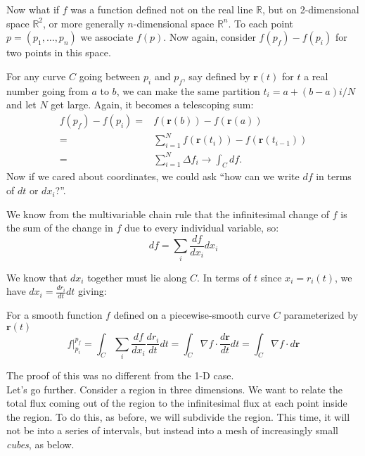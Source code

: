 \documentclass[../master.tex]{subfiles}
\begin{document}
	
	Now what if $f$ was a function defined not on the real line $\mathbb{R}$, but on 2-dimensional space $\mathbb{R}^2$, or more generally $n$-dimensional space $\mathbb{R}^n$. To each point $p = (p_1, \dots, p_n)$ we associate $f(p)$. Now again, consider $f(p_f)-f(p_i)$ for two points in this space.
	
	For any curve $C$ going between $p_i$ and $p_f$, say defined by $\mathbf r(t)$ for $t$ a real number going from $a$ to $b$, we can make the same partition $t_i = a + (b-a)i/N$ and let $N$ get large. Again, it becomes a telescoping sum:
	\begin{align*}
		f(p_f) - f(p_i) = &f(\mathbf r(b)) - f(\mathbf r(a)) \\= & \sum_{i=1}^N f(\mathbf r(t_{i}))-f(\mathbf r(t_{i-1})) \\ = & \sum_{i=1}^N \Delta f_i  \rightarrow \int_C df.
	\end{align*}
	Now if we cared about coordinates, we could ask ``how can we write $df$ in terms of $dt$ or $dx_i$?''. 
	
	We know from the multivariable chain rule that the infinitesimal change of $f$ is the sum of the change in $f$ due to every individual variable, so: 
	\begin{equation}
		df = \sum_i \frac{df}{dx_i} dx_i
	\end{equation}

	We know that $dx_i$ together must lie along $C$. In terms of $t$ since $x_i = r_i (t)$, we have $dx_i = \frac{dr_i}{dt} dt$ giving:
	\begin{theorem}
	For a smooth function $f$ defined on a piecewise-smooth curve $C$ parameterized by $\mathbf r(t)$
		\begin{equation}
			f\rvert^{p_f}_{p_i} = \int_C \sum_i \frac{df}{dx_i} \frac{dr_i}{dt} dt = \int_C \nabla f \cdot \frac{d \mathbf r}{dt} dt =  \int_C \nabla f \cdot d \mathbf r
		\end{equation}
	\end{theorem}
	The proof of this was no different from the 1-D case.\\
	
	Let's go further. Consider a region in three dimensions. We want to relate the total flux coming out of the region to the infinitesimal flux at each point inside the region. To do this, as before, we will subdivide the region. This time, it will not be into a series of intervals, but instead into a mesh of increasingly small \emph{cubes}, as below.
	
\end{document}
